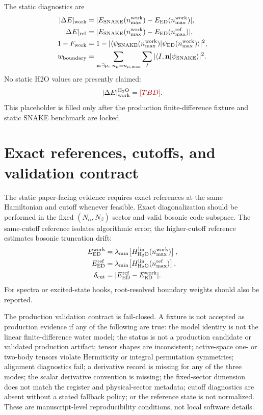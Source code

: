 \documentclass[
  reprint,
  amsmath,
  amssymb,
  aps,
  pra,
  nofootinbib,
  superscriptaddress,
  floatfix
]{revtex4-2}
\newcommand{\placeholder}[1]{\textcolor{red!70!black}{\ifmmode\left[#1\right]\else\textsf{[#1]}\fi}}
\newcommand{\braket}[2]{\langle #1|#2\rangle}
\newcommand{\ed}{\mathrm{ED}}
\newcommand{\HtwoO}{\mathrm{H_2O}}
\newcommand{\lin}{\mathrm{lin}}
\newcommand{\work}{\mathrm{work}}
\newcommand{\refc}{\mathrm{ref}}
\begin{document}
The static diagnostics are
\begin{align}
|\Delta E|_{\work}
&=
|E_{\rm SNAKE}(n_{\max}^{\work})-E_{\ed}(n_{\max}^{\work})|,
\nonumber\\
|\Delta E|_{\refc}
&=
|E_{\rm SNAKE}(n_{\max}^{\work})-E_{\ed}(n_{\max}^{\refc})|,
\nonumber\\
1-F_{\work}
&=
1-
|\braket{\psi_{\rm SNAKE}(n_{\max}^{\work})}{\psi_{\ed}(n_{\max}^{\work})}|^2,
\nonumber\\
w_{\rm boundary}
&=
\sum_{\mathbf n:\exists\mu,\ n_\mu=n_{\mu,\max}}
\sum_I
|\braket{I,\mathbf n}{\psi_{\rm SNAKE}}|^2 .
\label{eq:static_diagnostics}
\end{align}
No static H2O values are presently claimed:
\begin{equation}
|\Delta E|_{\work}^{\HtwoO}
=
\placeholder{TBD}.
\label{eq:h2o_static_placeholder}
\end{equation}
This placeholder is filled only after the production finite-difference fixture and static SNAKE benchmark are locked.

\section{Exact references, cutoffs, and validation contract}
\label{sec:evidence_contract}

The static paper-facing evidence requires exact references at the same Hamiltonian and cutoff whenever feasible.  Exact diagonalization should be performed in the fixed \((N_\alpha,N_\beta)\) sector and valid bosonic code subspace.  The same-cutoff reference isolates algorithmic error; the higher-cutoff reference estimates bosonic truncation drift:
\begin{align}
E_{\ed}^{\work}
&=
\lambda_{\min}\!\left[
H_{\HtwoO}^{\lin}(n_{\max}^{\work})
\right],
\nonumber\\
E_{\ed}^{\refc}
&=
\lambda_{\min}\!\left[
H_{\HtwoO}^{\lin}(n_{\max}^{\refc})
\right],
\nonumber\\
\delta_{\rm cut}
&=
|E_{\ed}^{\refc}-E_{\ed}^{\work}|.
\label{eq:exact_refs}
\end{align}
For spectra or excited-state hooks, root-resolved boundary weights should also be reported.

The production validation contract is fail-closed.  A fixture is not accepted as production evidence if any of the following are true: the model identity is not the linear finite-difference water model; the status is not a production candidate or validated production artifact; tensor shapes are inconsistent; active-space one- or two-body tensors violate Hermiticity or integral permutation symmetries; alignment diagnostics fail; a derivative record is missing for any of the three modes; the scalar derivative convention is missing; the fixed-sector dimension does not match the register and physical-sector metadata; cutoff diagnostics are absent without a stated fallback policy; or the reference state is not normalized.  These are manuscript-level reproducibility conditions, not local software details.
\end{document}
